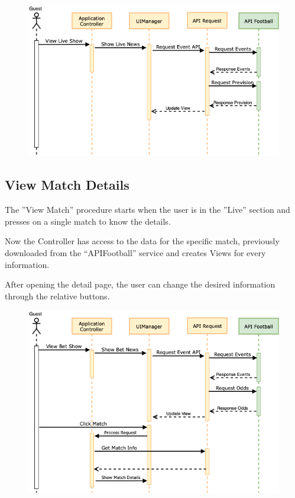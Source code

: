 \documentclass[numbers=noenddot, 12pt, a4paper, oneside]{scrbook}
\begin{document}
\begin{figure}[H]
	\centering
	\includegraphics[width=1\textwidth]{images/Sequence/SequenceLive}
\end{figure}


\newpage
\subsection*{View Match Details}
The ”View Match” procedure starts when the user is in the ”Live” section and presses on a single match to know the details.

Now the Controller has access to the data for the specific match, previously downloaded from the “APIFootball” service and creates Views for every information. 

After opening the detail page, the user can change the desired information through the relative buttons.

\begin{figure}[H]
	\centering
	\includegraphics[width=1\textwidth]{images/Sequence/SequenceMatchDetails}
\end{figure}
\end{document}
